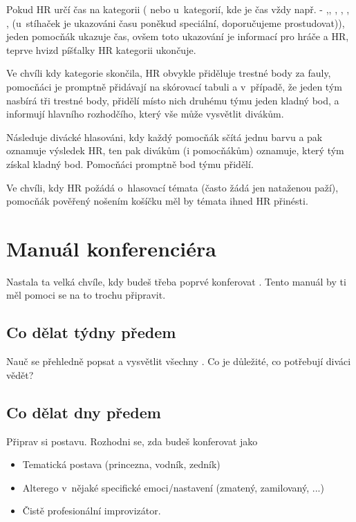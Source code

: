 Pokud HR určí čas na kategorii ( nebo u~kategorií, kde je čas vždy např. - ,, ,  , , ,  (u~stíhaček je ukazováni času poněkud speciální, doporučujeme prostudovat)), jeden pomocňák ukazuje čas, ovšem toto ukazování je informací pro hráče a HR, teprve hvizd píšťalky HR kategorii ukončuje. 
 
Ve chvíli kdy kategorie skončila, HR obvykle přiděluje trestné body za fauly, pomocňáci je promptně přidávají na skórovací tabuli a v~případě, že jeden tým nasbírá tři trestné body, přidělí místo nich  druhému týmu jeden kladný bod, a informují hlavního rozhodčího, který vše může vysvětlit divákům. 
 
Následuje divácké hlasováni, kdy každý pomocňák sčítá jednu barvu a pak oznamuje výsledek HR, ten pak divákům (i pomocňákům) oznamuje, který tým získal kladný bod. Pomocňáci promptně bod týmu přidělí. 
 
Ve chvíli, kdy HR požádá o~hlasovací témata (často žádá jen nataženou paží), pomocňák pověřený nošením košíčku měl by témata ihned HR přinésti. 
\needspace{5cm} \section{Manuál konferenciéra} \label{manuál konferenciéra} Nastala ta velká chvíle, kdy budeš třeba poprvé konferovat . Tento manuál by ti měl pomoci se na to trochu připravit. 
 
\subsection{ Co dělat týdny předem } Nauč se přehledně popsat a vysvětlit všechny . Co je důležité, co potřebují diváci vědět?  
\subsection{ Co dělat dny předem } Připrav si postavu. Rozhodni se, zda budeš konferovat jako 
\begin{itemize}
\item  Tematická postava (princezna, vodník, zedník)
\item  Alterego v~nějaké  specifické emoci/nastavení (zmatený, zamilovaný, ...)
\item  Čistě profesionální improvizátor.
\end{itemize}
 
